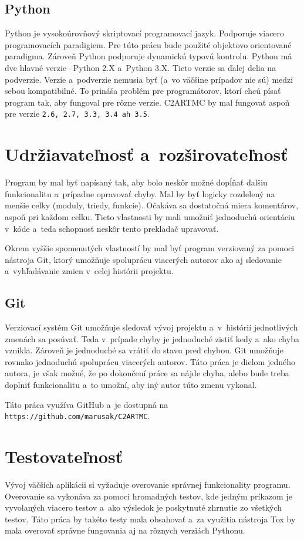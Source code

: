 \subsection{Python}
\label{subsec_python}
Python je vysokoúrovňový skriptovací programovací jazyk. Podporuje viacero programovacích
paradigiem. Pre túto prácu bude použité objektovo orientované paradigma. Zároveň Python podporuje
dynamickú typovú kontrolu.
Python má dve hlavné verzie\,--\,Python 2.X a~Python 3.X. Tieto verzie sa ďalej delia na podverzie.
Verzie a~podverzie nemusia byť (a~vo väčšine prípadov nie sú) medzi sebou kompatibilné. To prináša problém
pre programátorov, ktorí chcú písať program tak, aby fungoval pre rôzne verzie.
C2ARTMC by mal fungovať aspoň pre verzie \texttt{2.6, 2.7, 3.3, 3.4 ah 3.5}.

\section{Udržiavateľnosť a~rozširovateľnosť}
Program by mal byť napísaný tak, aby bolo neskôr možné dopĺňať ďalšiu funkcionalitu a~prípadne opravovať chyby. Mal by byť logicky rozdelený na menšie celky (moduly, triedy, funkcie). Očakáva sa dostatočná miera komentárov, aspoň pri každom celku. Tieto vlastnosti by mali umožniť jednoduchú orientáciu v~kóde a~teda schopnosť neskôr tento prekladač upravovať.

Okrem vyššie spomenutých vlastností by mal byť program verziovaný za pomoci nástroja Git, ktorý umožňuje spoluprácu viacerých autorov ako aj sledovanie a~vyhľadávanie zmien v~celej histórii projektu.

\subsection{Git}
Verziovací systém Git umožňuje sledovať vývoj projektu a~v~histórií jednotlivých zmenách sa posúvať. Teda v~prípade chyby je jednoduché zistiť kedy a~ako chyba
vznikla. Zároveň je jednoduché sa vrátiť do stavu pred chybou.
Git umožňuje rovnako jednoduchú spoluprácu viacerých autorov. Táto práca je dielom jedného autora, je však možné, že po dokončení práce sa nájde
chyba, alebo bude treba doplniť funkcionalitu a~to umožní, aby iný autor túto zmenu
vykonal.

Táto práca využíva GitHub a~je dostupná na \texttt{https://github.com/marusak/C2ARTMC}.

\section{Testovateľnosť}
Vývoj väčších aplikácii si vyžaduje overovanie správnej funkcionality programu. Overovanie sa vykonáva za pomoci hromadných testov, kde jedným príkazom je vyvolaných viacero testov a~ako výsledok je poskytnuté zhrnutie zo všetkých testov. Táto práca by takéto testy mala obsahovať a~za využitia nástroja Tox by mala overovať správne fungovania aj na rôznych verziách Pythonu.

